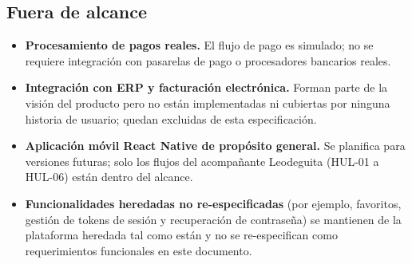 \subsection*{Fuera de alcance}
\begin{itemize}[leftmargin=*]
    \item \textbf{Procesamiento de pagos reales.} El flujo de pago es simulado; no se requiere integración con pasarelas de pago o procesadores bancarios reales.
    \item \textbf{Integración con ERP y facturación electrónica.} Forman parte de la visión del producto pero no están implementadas ni cubiertas por ninguna historia de usuario; quedan excluidas de esta especificación.
    \item \textbf{Aplicación móvil React Native de propósito general.} Se planifica para versiones futuras; solo los flujos del acompañante Leodeguita (HUL-01 a HUL-06) están dentro del alcance.
    \item \textbf{Funcionalidades heredadas no re-especificadas} (por ejemplo, favoritos, gestión de tokens de sesión y recuperación de contraseña) se mantienen de la plataforma heredada tal como están y no se re-especifican como requerimientos funcionales en este documento.
\end{itemize}
